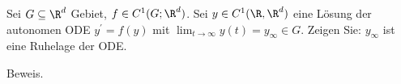 \begin{exercise}
Sei $G \subseteq \R^d$ Gebiet, $f \in C^1(G;\R^d)$. Sei $y \in C^1(\R,\R^d)$
eine Lösung der autonomen ODE $y^{\prime} = f(y)$ mit
$\lim_{t \rightarrow \infty} y(t) = y_{\infty} \in G$.
Zeigen Sie: $y_{\infty}$ ist eine Ruhelage der ODE.
\end{exercise}
\begin{solution}
Beweis.
\end{solution}
